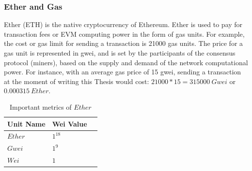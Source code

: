 \documentclass[11pt,a4paper]{report}
\begin{document}
\subsubsection{Ether and Gas}\label{sec:gas}
Ether (ETH) is the native cryptocurrency of Ethereum. Ether is used to pay for transaction fees or EVM computing power in the form of gas units. For example, the cost or gas limit for sending a transaction is 21000 gas units\cite{wood2014ethereum-Fee}. The price for a gas unit is represented in gwei, and is set by the participants of the consensus protocol (miners), based on the supply and demand of the network computational power\cite{book:masteringETH-gas}.
For instance, with an average gas price of 15 gwei\cite{gastracker}, sending a transaction at the moment of writing this Thesis would cost: $21000*15 = 315000~Gwei$ or $0.000315~Ether.$
\begin{table}[htp]
\centering
\begin{tabular}{|l|l|l|}
	\hline
	\multicolumn{1}{|c|}{\textbf{Unit Name}} & 
	\multicolumn{1}{|c|}{\textbf{Wei Value}} \\\hline
	$Ether$ & $1^{18}$  \\\hline
	$Gwei$  & $1^{9}$  \\\hline
	$Wei$   & $1$     \\\hline   
\end{tabular}
\caption{Important metrics of $Ether$}
\label{tab:Ether_metrics}
\end{table}
\end{document}
